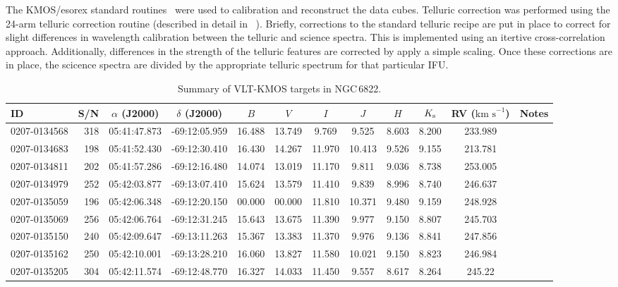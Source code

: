 \documentclass[useAMS,usenatbib]{mn2e}
\def\kms{$\mbox{km s}^{-1}$}
\begin{document}
The KMOS/esorex standard routines~\citep[SPARK;]{2013A&A...558A..56D} were used to calibration and reconstruct the data cubes.
Telluric correction was performed using the 24-arm telluric correction routine (described in detail in ~\cite{2015ApJ...803...14P}).
Briefly, corrections to the standard telluric recipe are put in place to correct for slight differences in wavelength calibration between the telluric and science spectra.
This is implemented using an itertive cross-correlation approach.
Additionally, differences in the strength of the telluric features are corrected by apply a simple scaling.
Once these corrections are in place, the scicence spectra are divided by the appropriate telluric spectrum for that particular IFU.


\begin{table}
\caption{
        Summary of VLT-KMOS targets in NGC\,6822.\label{tb:obs-params}
        }
\scriptsize
\begin{center}
\begin{tabular}{lrcccccccccl}
 \hline
 \hline
ID & S/N & $\alpha$ (J2000) & $\delta$ (J2000) & $B$ & $V$ & $I$ & $J$ & $H$ & $K_{\rm s}$ & RV (\kms) & Notes \\
 \hline
0207-0134568 & 318 & 05:41:47.873 & -69:12:05.959 & 16.488 & 13.749 &  9.769 &  9.525 &  8.603 & 8.200 & 233.989\\
0207-0134683 & 198 & 05:41:52.430 & -69:12:30.410 & 16.430 & 14.267 & 11.970 & 10.413 &  9.526 & 9.155 & 213.781\\
0207-0134811 & 202 & 05:41:57.286 & -69:12:16.480 & 14.074 & 13.019 & 11.170 &  9.811 &  9.036 & 8.738 & 253.005\\
0207-0134979 & 252 & 05:42:03.877 & -69:13:07.410 & 15.624 & 13.579 & 11.410 &  9.839 &  8.996 & 8.740 & 246.637\\
0207-0135059 & 196 & 05:42:06.348 & -69:12:20.150 & 00.000 & 00.000 & 11.810 & 10.371 &  9.480 & 9.159 & 248.928\\
0207-0135069 & 256 & 05:42:06.764 & -69:12:31.245 & 15.643 & 13.675 & 11.390 &  9.977 &  9.150 & 8.807 & 245.703\\
0207-0135150 & 240 & 05:42:09.647 & -69:13:11.263 & 15.367 & 13.383 & 11.370 &  9.976 &  9.136 & 8.841 & 247.856\\
0207-0135162 & 250 & 05:42:10.001 & -69:13:28.210 & 16.060 & 13.827 & 11.580 & 10.021 &  9.150 & 8.823 & 246.984\\
0207-0135205 & 304 & 05:42:11.574 & -69:12:48.770 & 16.327 & 14.033 & 11.450 &  9.557 &  8.617 & 8.264 & 245.22\\

\end{tabular}
\end{center}
\end{table}
\end{document}
